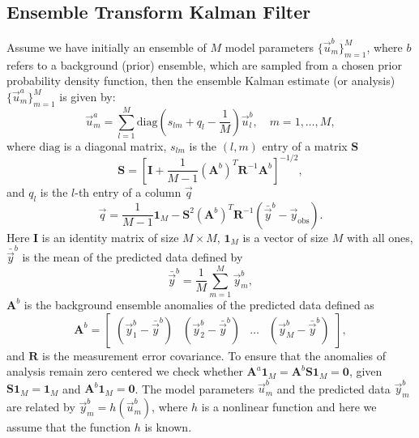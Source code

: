 \documentclass[12, a4paper]{article}
\numberwithin{equation}{section}
\begin{document}
 \subsection{Ensemble Transform Kalman Filter} 
Assume we have initially an ensemble of $M$ model parameters $\{\vec{u}_m^b\}_{m=1}^{M}$, where $b$ refers to a background (prior) ensemble, which are sampled from a chosen prior probability density function, then the ensemble Kalman  estimate (or analysis)  $\{\vec{u}_m^a\}_{m=1}^{M}$ is given by:
\begin{equation*} 
{\vec{u}}^a_m  = \sum_{l=1}^{M} \text{diag}\left( s_{lm} + q_l - \frac{1}{M}\right)\vec{u}^b_l,\quad m = 1,\hdots,M,
\end{equation*}
where $\text{diag}$ is a diagonal matrix, $s_{lm}$ is the $(l,m)$ entry of a matrix $\textbf{S}$
\begin{equation}\label{S} 
\textbf{S} = \left[ \textbf{I}+\frac{1}{M-1} (\textbf{A}^b)^T \textbf{R}^{-1} \textbf{A}^b\right]^{-1/2},      
\end{equation}
and $q_l$ is the $l$-th entry of a column $\vec{q}$
\begin{equation*}
{\vec{q}} = \frac{1}{M-1}\textbf{1}_M - \textbf{S}^2(\textbf{A}^b)^T \textbf{R}^{-1} (\bar{\vec{y}}^b - \vec{y}_{\text{obs}} ).
\end{equation*}
Here \textbf{I} is an identity matrix of size $M \times M$, $\textbf{1}_M$ is a vector of size $M$ with all ones,
$\bar{\vec{y}}^b $ is the mean of the predicted data defined by
\begin{equation*}
\bar{\vec{y}}^b=\frac{1}{M}\sum_{m=1}^{M}\vec{y}_m^b,
\end{equation*}
$\textbf{A}^b$  is the background ensemble anomalies of the predicted data defined as
\begin{equation*}
\textbf{A}^b=  \begin{bmatrix}
(\vec{y}_1^b-\bar{\vec{y}}^b)      & (\vec{y}_2^b-\bar{\vec{y}}^b)  &\dots &(\vec{y}_M^b-\bar{\vec{y}}^b) 
\end{bmatrix}, 
\end{equation*}
and  $\textbf{R}$ is the measurement error covariance. To ensure that the anomalies of analysis remain zero centered we check whether $\textbf{A}^a\textbf{1}_M=\textbf{A}^b\textbf{S}\textbf{1}_M=\textbf{0}$, given $\textbf{S}\textbf{1}_M =\textbf{1}_M$ and $\textbf{A}^b\textbf{1}_M=\textbf{0}$. The model parameters $\vec{u}_m^b$ and the predicted data $\vec{y}_m^b$ are related by $\vec{y}_m^b = h(\vec{u}_m^b)$, where $h$ is a nonlinear function and here we assume that the function $h$ is known. 
\end{document}
